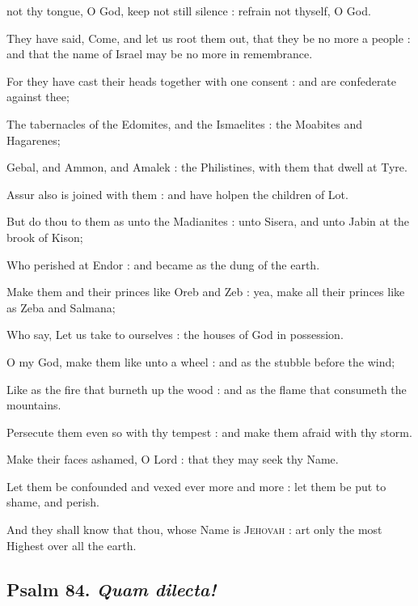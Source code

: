  not thy tongue, O God, keep not still silence : refrain not thyself, O God.\par
{}
They have said, Come, and let us root them out, that they be no more a people : and that the name of Israel may be no more in remembrance.\par
{}For they have cast their heads together with one consent : and are confederate against thee;\par
{}The tabernacles of the Edomites, and the Ismaelites : the Moabites and Hagarenes;\par
{}Gebal, and Ammon, and Amalek : the Philistines, with them that dwell at Tyre.\par
{}Assur also is joined with them : and have holpen the children of Lot.\par
{}But do thou to them as unto the Madianites : unto Sisera, and unto Jabin at the brook of Kison;\par
{}Who perished at Endor : and became as the dung of the earth.\par
{}Make them and their princes like Oreb and Zeb : yea, make all their princes like as Zeba and Salmana;\par
{}Who say, Let us take to ourselves : the houses of God in possession.\par
{}O my God, make them like unto a wheel : and as the stubble before the wind;\par
{}Like as the fire that burneth up the wood : and as the flame that consumeth the mountains.\par
{}Persecute them even so with thy tempest : and make them afraid with thy storm.\par
{}Make their faces ashamed, O Lord : that they may seek thy Name.\par
{}Let them be confounded and vexed ever more and more : let them be put to shame, and perish.\par
{}And they shall know that thou, whose Name is \textsc{Jehovah} : art only the most Highest over all the earth.\par

\subsection{Psalm 84. \textit{Quam dilecta!}}

